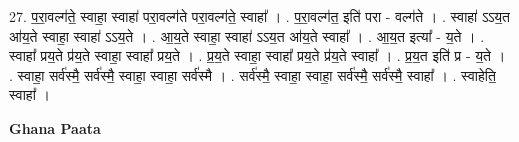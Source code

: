 \documentclass[17pt]{extarticle}
\begin{document}
27. प॒रा॒वल्ग॑ते॒ स्वाहा॒ स्वाहा॑ परा॒वल्ग॑ते परा॒वल्ग॑ते॒ स्वाहा᳚ । . प॒रा॒वल्ग॑त॒ इति॑ परा - वल्ग॑ते । . स्वाहा॑ ऽऽय॒त आ॑य॒ते स्वाहा॒ स्वाहा॑ ऽऽय॒ते । . आ॒य॒ते स्वाहा॒ स्वाहा॑ ऽऽय॒त आ॑य॒ते स्वाहा᳚ । . आ॒य॒त इत्या᳚ - य॒ते । . स्वाहा᳚ प्रय॒ते प्र॑य॒ते स्वाहा॒ स्वाहा᳚ प्रय॒ते । . प्र॒य॒ते स्वाहा॒ स्वाहा᳚ प्रय॒ते प्र॑य॒ते स्वाहा᳚ । . प्र॒य॒त इति॑ प्र - य॒ते । . स्वाहा॒ सर्व॑स्मै॒ सर्व॑स्मै॒ स्वाहा॒ स्वाहा॒ सर्व॑स्मै । . सर्व॑स्मै॒ स्वाहा॒ स्वाहा॒ सर्व॑स्मै॒ सर्व॑स्मै॒ स्वाहा᳚ । . स्वाहेति॒ स्वाहा᳚ । \newline

\textbf{Ghana Paata } \newline
\end{document}
